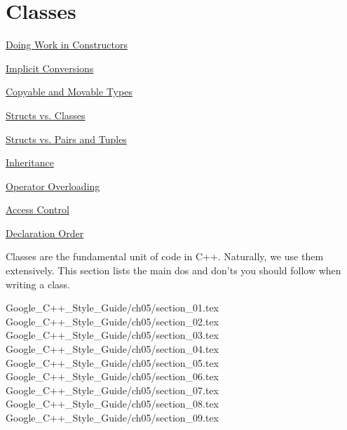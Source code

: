
\chapter{Classes}\label{ch:classes}

\begin{introduction}
    \item \hyperref[sec:doing-work-in-constructors]{Doing Work in Constructors}
    \item \hyperref[sec:implicit-conversions]{Implicit Conversions}
    \item \hyperref[sec:copyable-and-movable-types]{Copyable and Movable Types}
    \item \hyperref[sec:structs-vs.-classes]{Structs vs. Classes}
    \item \hyperref[sec:structs-vs.-pairs-and-tuples]{Structs vs. Pairs and Tuples}
    \item \hyperref[sec:inheritance]{Inheritance}
    \item \hyperref[sec:operator-overloading]{Operator Overloading}
    \item \hyperref[sec:access-control]{Access Control}
    \item \hyperref[sec:declaration-order]{Declaration Order}
\end{introduction}

Classes are the fundamental unit of code in C++. Naturally, we use them extensively. This section lists the main dos and don'ts you should follow when writing a class.

{Google_C++_Style_Guide/ch05/section_01.tex}
{Google_C++_Style_Guide/ch05/section_02.tex}
{Google_C++_Style_Guide/ch05/section_03.tex}
{Google_C++_Style_Guide/ch05/section_04.tex}
{Google_C++_Style_Guide/ch05/section_05.tex}
{Google_C++_Style_Guide/ch05/section_06.tex}
{Google_C++_Style_Guide/ch05/section_07.tex}
{Google_C++_Style_Guide/ch05/section_08.tex}
{Google_C++_Style_Guide/ch05/section_09.tex}